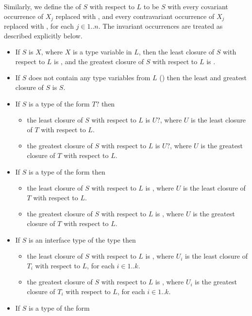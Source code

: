 \documentclass[makeidx]{article}
\begin{document}
{\LMHash{}%
Similarly, we define the
of $S$ with respect to $L$ to be $S$
with every covariant occurrence of $X_j$ replaced with ,
and every contravariant occurrence of $X_j$ replaced with ,
for each $j \in 1 .. n$.
The invariant occurrences are treated as described explicitly below.

\begin{itemize}
\item
  If $S$ is $X$, where $X$ is a type variable in $L$, then
  the least closure of $S$ with respect to $L$ is ,
  and the greatest closure of $S$ with respect to $L$ is .
\item
  If $S$ does not contain any type variables from $L$
  ()
  then the least and greatest closure of $S$ is $S$.
\item
  If $S$ is a type of the form $T?$ then
  \begin{itemize}
  \item
    the least closure of $S$ with respect to $L$ is $U?$,
    where $U$ is the least closure of $T$ with respect to $L$.
  \item
    the greatest closure of $S$ with respect to $L$ is $U?$,
    where $U$ is the greatest closure of $T$ with respect to $L$.
  \end{itemize}
\item
  If $S$ is a type of the form  then
  \begin{itemize}
  \item
    the least closure of $S$ with respect to $L$ is ,
    where $U$ is the least closure of $T$ with respect to $L$.
  \item
    the greatest closure of $S$ with respect to $L$ is ,
    where $U$ is the greatest closure of $T$ with respect to $L$.
  \end{itemize}
\item
  If $S$ is an interface type of the type  then
  \begin{itemize}
  \item
    the least closure of $S$ with respect to $L$ is ,
    where $U_i$ is the least closure of $T_i$ with respect to $L$,
    for each $i \in 1 .. k$.
  \item
    the greatest closure of $S$ with respect to $L$
    is ,
    where $U_i$ is the greatest closure of $T_i$ with respect to $L$,
    for each $i \in 1 .. k$.
  \end{itemize}
\item
  If $S$ is a type of the form


\end{itemize}}
\end{document}
